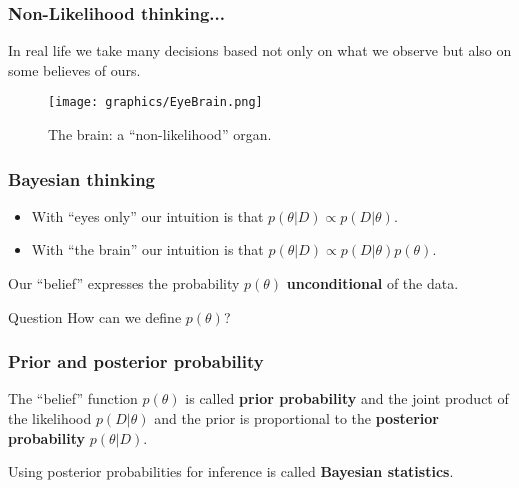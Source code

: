 \documentclass{beamer}
\newcommand{\1}{\ensuremath{\mathbf{1}}}
\begin{document}
%
%
%
\begin{frame}\frametitle{Non-Likelihood thinking...}
	In real life we take many decisions based not only on what we observe but also on some believes of ours.
	\begin{figure}
	\begin{center}
		\texttt{[image: graphics/EyeBrain.png]}
	\end{center}
	\caption{The brain: a ``non-likelihood'' organ.}
	\end{figure}
\end{frame}
%
%
%
\begin{frame}\frametitle{Bayesian thinking}
	\begin{itemize}
		\item With ``eyes only'' our intuition is that $p(\theta|D) \propto p(D|\theta)$.
		\item With ``the brain'' our intuition is that $p(\theta|D) \propto p(D|\theta)p(\theta)$.
	\end{itemize}
	Our ``belief'' expresses the probability $p(\theta)$ \textbf{unconditional} of the data.
	\begin{block}{Question}
		How can we define $p(\theta)$?
	\end{block}
\end{frame}
%
%
%
\begin{frame}\frametitle{Prior and posterior probability}
	\begin{block}{}
		The ``belief'' function $p(\theta)$ is called \textbf{prior probability} and the joint product of the likelihood $p(D|\theta)$ and the prior is proportional to the \textbf{posterior probability} $p(\theta|D)$.
	\end{block}
	\begin{block}{}
		Using posterior probabilities for inference is called \textbf{Bayesian statistics}.
	\end{block}
\end{frame}
%
%
%
\end{document}
